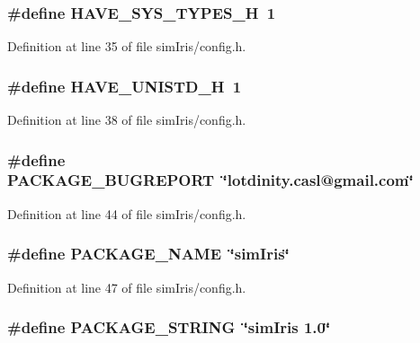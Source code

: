 \subsubsection[{HAVE\_\-SYS\_\-TYPES\_\-H}]{\setlength{\rightskip}{0pt plus 5cm}\#define HAVE\_\-SYS\_\-TYPES\_\-H~1}\label{simIris_2config_8h_69dc70bea5d1f8bd2be9740e974fa666}




Definition at line 35 of file simIris/config.h.
\subsubsection[{HAVE\_\-UNISTD\_\-H}]{\setlength{\rightskip}{0pt plus 5cm}\#define HAVE\_\-UNISTD\_\-H~1}\label{simIris_2config_8h_219b06937831d0da94d801ab13987639}




Definition at line 38 of file simIris/config.h.
\subsubsection[{PACKAGE\_\-BUGREPORT}]{\setlength{\rightskip}{0pt plus 5cm}\#define PACKAGE\_\-BUGREPORT~\char`\"{}lotdinity.casl@gmail.com\char`\"{}}\label{simIris_2config_8h_1d1d2d7f8d2f95b376954d649ab03233}




Definition at line 44 of file simIris/config.h.
\subsubsection[{PACKAGE\_\-NAME}]{\setlength{\rightskip}{0pt plus 5cm}\#define PACKAGE\_\-NAME~\char`\"{}simIris\char`\"{}}\label{simIris_2config_8h_1c0439e4355794c09b64274849eb0279}




Definition at line 47 of file simIris/config.h.
\subsubsection[{PACKAGE\_\-STRING}]{\setlength{\rightskip}{0pt plus 5cm}\#define PACKAGE\_\-STRING~\char`\"{}simIris 1.0\char`\"{}}\label{simIris_2config_8h_c73e6f903c16eca7710f92e36e1c6fbf}




